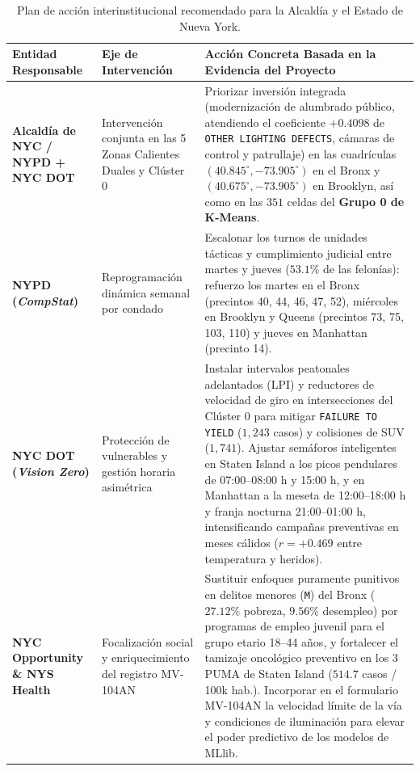 \documentclass[11pt,a4paper]{article}
\begin{document}
\begin{table}[H]
\centering
\scriptsize
\renewcommand{\arraystretch}{1.3}
\caption{Plan de acción interinstitucional recomendado para la Alcaldía y el Estado de Nueva York.}
\label{tab:recomendaciones_ejecutivas}
\begin{tabularx}{\linewidth}{>{\raggedright\arraybackslash}p{2.7cm} >{\raggedright\arraybackslash}p{3.4cm} X}
\toprule
\textbf{Entidad Responsable} & \textbf{Eje de Intervención} & \textbf{Acción Concreta Basada en la Evidencia del Proyecto} \\
\midrule
\textbf{Alcaldía de NYC / NYPD + NYC DOT} & Intervención conjunta en las 5 Zonas Calientes Duales y Clúster 0 & Priorizar inversión integrada (modernización de alumbrado público, atendiendo el coeficiente $+0.4098$ de \texttt{OTHER LIGHTING DEFECTS}, cámaras de control y patrullaje) en las cuadrículas $(40.845^\circ, -73.905^\circ)$ en el Bronx y $(40.675^\circ, -73.905^\circ)$ en Brooklyn, así como en las $351$ celdas del \textbf{Grupo 0 de K-Means}. \\
\textbf{NYPD (\textit{CompStat})} & Reprogramación dinámica semanal por condado & Escalonar los turnos de unidades tácticas y cumplimiento judicial entre martes y jueves ($53.1\%$ de las felonías): refuerzo los martes en el Bronx (precintos 40, 44, 46, 47, 52), miércoles en Brooklyn y Queens (precintos 73, 75, 103, 110) y jueves en Manhattan (precinto 14). \\
\textbf{NYC DOT (\textit{Vision Zero})} & Protección de vulnerables y gestión horaria asimétrica & Instalar intervalos peatonales adelantados (LPI) y reductores de velocidad de giro en intersecciones del Clúster 0 para mitigar \texttt{FAILURE TO YIELD} ($1,243$ casos) y colisiones de SUV ($1,741$). Ajustar semáforos inteligentes en Staten Island a los picos pendulares de 07:00--08:00 h y 15:00 h, y en Manhattan a la meseta de 12:00--18:00 h y franja nocturna 21:00--01:00 h, intensificando campañas preventivas en meses cálidos ($r = +0.469$ entre temperatura y heridos). \\
\textbf{NYC Opportunity \& NYS Health} & Focalización social y enriquecimiento del registro MV-104AN & Sustituir enfoques puramente punitivos en delitos menores (\texttt{M}) del Bronx ($27.12\%$ pobreza, $9.56\%$ desempleo) por programas de empleo juvenil para el grupo etario 18--44 años, y fortalecer el tamizaje oncológico preventivo en los 3 PUMA de Staten Island ($514.7$ casos / 100k hab.). Incorporar en el formulario MV-104AN la velocidad límite de la vía y condiciones de iluminación para elevar el poder predictivo de los modelos de MLlib. \\
\bottomrule
\end{tabularx}
\end{table}



\newpage


\end{document}
